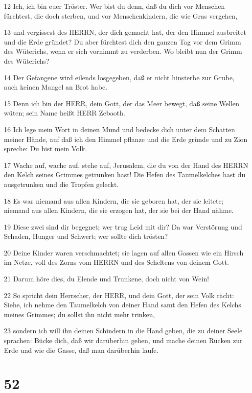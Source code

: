 \par 12 Ich, ich bin euer Tröster. Wer bist du denn, daß du dich vor Menschen fürchtest, die doch sterben, und vor Menschenkindern, die wie Gras vergehen,
\par 13 und vergissest des HERRN, der dich gemacht hat, der den Himmel ausbreitet und die Erde gründet? Du aber fürchtest dich den ganzen Tag vor dem Grimm des Wüterichs, wenn er sich vornimmt zu verderben. Wo bleibt nun der Grimm des Wüterichs?
\par 14 Der Gefangene wird eilends losgegeben, daß er nicht hinsterbe zur Grube, auch keinen Mangel an Brot habe.
\par 15 Denn ich bin der HERR, dein Gott, der das Meer bewegt, daß seine Wellen wüten; sein Name heißt HERR Zebaoth.
\par 16 Ich lege mein Wort in deinen Mund und bedecke dich unter dem Schatten meiner Hände, auf daß ich den Himmel pflanze und die Erde gründe und zu Zion spreche: Du bist mein Volk.
\par 17 Wache auf, wache auf, stehe auf, Jerusalem, die du von der Hand des HERRN den Kelch seines Grimmes getrunken hast! Die Hefen des Taumelkelches hast du ausgetrunken und die Tropfen geleckt.
\par 18 Es war niemand aus allen Kindern, die sie geboren hat, der sie leitete; niemand aus allen Kindern, die sie erzogen hat, der sie bei der Hand nähme.
\par 19 Diese zwei sind dir begegnet; wer trug Leid mit dir? Da war Verstörung und Schaden, Hunger und Schwert; wer sollte dich trösten?
\par 20 Deine Kinder waren verschmachtet; sie lagen auf allen Gassen wie ein Hirsch im Netze, voll des Zorns vom HERRN und des Scheltens von deinem Gott.
\par 21 Darum höre dies, du Elende und Trunkene, doch nicht von Wein!
\par 22 So spricht dein Herrscher, der HERR, und dein Gott, der sein Volk rächt: Siehe, ich nehme den Taumelkelch von deiner Hand samt den Hefen des Kelchs meines Grimmes; du sollst ihn nicht mehr trinken,
\par 23 sondern ich will ihn deinen Schindern in die Hand geben, die zu deiner Seele sprachen: Bücke dich, daß wir darüberhin gehen, und mache deinen Rücken zur Erde und wie die Gasse, daß man darüberhin laufe.

\chapter{52}

